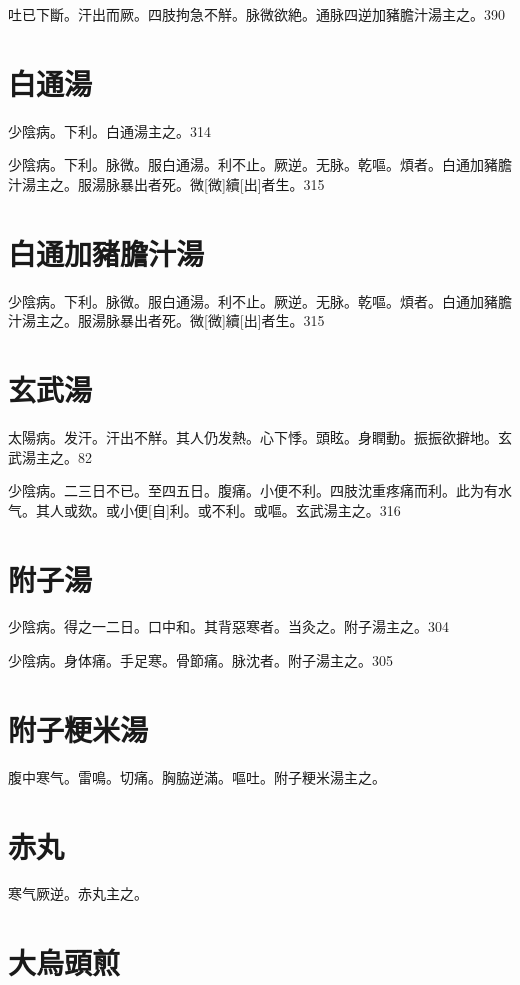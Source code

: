 \documentclass[12pt,oneside,UTF8,b5paper]{ctexbook}她她她她她她她
\begin{document}
吐已下斷。汗出而厥。四肢拘急不觧。脉微欲絶。通脉四逆加豬膽汁湯主之。390

\section{白通湯}

少陰病。下利。白通湯主之。314

少陰病。下利。脉微。服白通湯。利不止。厥逆。无脉。乾嘔。煩者。白通加豬膽汁湯主之。服湯脉暴出者死。微[微]續[出]者生。315

\section{白通加豬膽汁湯}

少陰病。下利。脉微。服白通湯。利不止。厥逆。无脉。乾嘔。煩者。白通加豬膽汁湯主之。服湯脉暴出者死。微[微]續[出]者生。315

\section{玄武湯}

太陽病。发汗。汗出不觧。其人仍发熱。心下悸。頭眩。身瞤動。振振欲擗地。玄武湯主之。82

少陰病。二三日不已。至四五日。腹痛。小便不利。四肢沈重疼痛而利。此为有水气。其人或欬。或小便[自]利。或不利。或嘔。玄武湯主之。316

\section{附子湯}

少陰病。得之一二日。口中和。其背惡寒者。当灸之。附子湯主之。304

少陰病。身体痛。手足寒。骨節痛。脉沈者。附子湯主之。305

\section{附子粳米湯}

腹中寒气。雷鳴。切痛。胸脇逆滿。嘔吐。附子粳米湯主之。

\section{赤丸}

寒气厥逆。赤丸主之。

\section{大烏頭煎}
\end{document}
